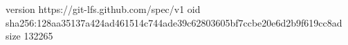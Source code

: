 version https://git-lfs.github.com/spec/v1
oid sha256:128aa35137a424ad461514c744ade39c62803605bf7ccbe20e6d2b9f619cc8ad
size 132265
